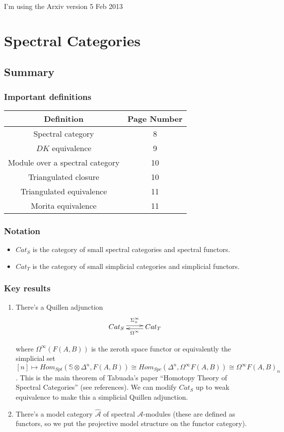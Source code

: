 \documentclass[letterpaper]{article}
\theoremstyle{definition}
\newcommand{\mbb}{\mathbb}
\newcommand{\mc}{\mathcal}
\begin{document}
I'm using the Arxiv version 5 Feb 2013

\section{Spectral Categories}

\subsection{Summary}
\subsubsection{Important definitions}
\begin{tabular}{|c|c|}
\hline
Definition & Page Number\\
\hline
\hline
Spectral category & 8\\
\hline
$DK$ equivalence &9\\
\hline
Module over a spectral category &10\\
\hline
Triangulated closure &10 \\
\hline
Triangulated equivalence  & 11\\
\hline
Morita equivalence & 11\\
\hline
\end{tabular}

\subsubsection{Notation}
\begin{itemize}
\item $Cat_S$ is the category of small spectral categories and
  spectral functors. 
\item $Cat_T$ is the category of small simplicial categories and
  simplicial functors. 
\end{itemize}
\subsubsection{Key results}
\begin{enumerate}
\item There's a Quillen adjunction
\[
\xymatrix{Cat_S \ar@<.5ex>[r]^{\Sigma^\infty_+} & \ar@<.5ex>[l]^{\Omega^\infty} Cat_T}
\]

where $\Omega^\infty(F(A,B))$ is the zeroth space functor or
equivalently the simplicial
set $[n] \mapsto Hom_{Spt}(\mbb S \otimes \Delta^n,F(A,B)) \cong
Hom_{Spc}(\Delta^n,\Omega^\infty F(A,B)) \cong \Omega^\infty
F(A,B)_n$. This is the main theorem of Tabuada's paper ``Homotopy
Theory of Spectral Categories'' (see references). We can modify
$Cat_S$ up to weak equivalence to make this a simplicial Quillen
adjunction.

\item There's a model category $\widehat{\mc A}$ of spectral $\mc
  A$-modules (these are defined as functors, so we put the projective
  model structure on the functor category).
\end{enumerate}
\end{document}
